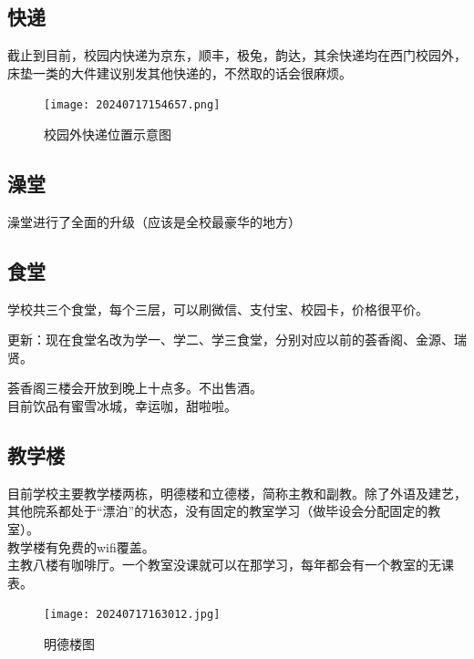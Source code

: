 \documentclass[12pt]{article} %
\begin{document}

	\subsection{快递} 
截止到目前，校园内快递为京东，顺丰，极兔，韵达，其余快递均在西门校园外，床垫一类的大件建议别发其他快递的，不然取的话会很麻烦。
		\begin{figure}[h]
		\centering
		\texttt{[image: 20240717154657.png]}
		\caption{校园外快递位置示意图} %
	\end{figure}
	
	
	
	\subsection{澡堂} 
	澡堂进行了全面的升级（应该是全校最豪华的地方）
	
	
	
	\subsection{食堂}
	学校共三个食堂，每个三层，可以刷微信、支付宝、校园卡，价格很平价。
	
	更新：现在食堂名改为学一、学二、学三食堂，分别对应以前的荟香阁、金源、瑞贤。
	
	荟香阁三楼会开放到晚上十点多。不出售酒。\\
	
	目前饮品有蜜雪冰城，幸运咖，甜啦啦。
	
	\subsection{教学楼}
	目前学校主要教学楼两栋，明德楼和立德楼，简称主教和副教。除了外语及建艺，其他院系都处于“漂泊”的状态，没有固定的教室学习（做毕设会分配固定的教室）。\\
	
	教学楼有免费的wifi覆盖。\\
	
	主教八楼有咖啡厅。一个教室没课就可以在那学习，每年都会有一个教室的无课表。\\
	
		\begin{figure}[!h]
		\centering
		\texttt{[image: 20240717163012.jpg]}
		\caption{明德楼图} %
	\end{figure}

		
		
\end{document}
